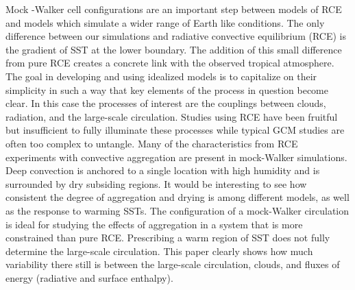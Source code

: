 \documentclass[draft]{agujournal2019}
\begin{document}
{%

Mock -Walker cell configurations are an important step between models of RCE and models which simulate a wider range of Earth like conditions.
The only difference between our simulations and radiative convective equilibrium (RCE) is the gradient of SST at the lower boundary.  
The addition of this small difference from pure RCE creates a concrete link with the observed tropical atmosphere.  
The goal in developing and using idealized models is to capitalize on their simplicity in such a way that key elements of the 
process in question become clear.  
In this case the processes of interest are the couplings between clouds, radiation, and the large-scale circulation.  
Studies using RCE have been fruitful but insufficient to fully illuminate these processes while typical GCM studies are often too complex to untangle.  
Many of the characteristics from RCE experiments with convective aggregation are present in mock-Walker simulations.   
Deep convection is anchored to a single location with high humidity and is surrounded by dry subsiding regions.  
It would be interesting to see how consistent the degree of aggregation and drying is among 
different models, as well as the response to warming SSTs.  The configuration of a mock-Walker circulation 
is ideal for studying the effects of aggregation in a system that is more constrained than pure RCE.     
Prescribing a warm region of SST does not fully determine the large-scale circulation.  
This paper clearly shows how much variability there still is between the large-scale circulation, clouds, 
and fluxes of energy (radiative and surface enthalpy).
}
\end{document}
